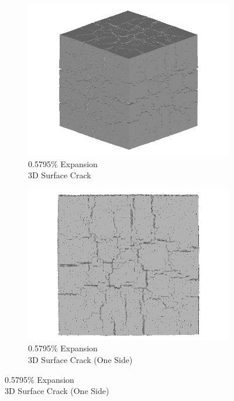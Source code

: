 \begin{figure}[ht!]
    \begin{subfigure}{.5\textwidth}
      \centering
      \includegraphics[width=0.5\linewidth]{Files/exp_3D/DEF/A30X0C_3_3d.png}
      \caption{0.5795\% Expansion\\3D Surface Crack}
    \end{subfigure}%
    \begin{subfigure}{.5\textwidth}
      \centering
      \includegraphics[width=0.5\linewidth]{Files/exp_3D/DEF/A30X0C_3_3ds.png}
      \caption{0.5795\% Expansion\\3D Surface Crack (One Side)}
    \end{subfigure}%


\end{figure}
